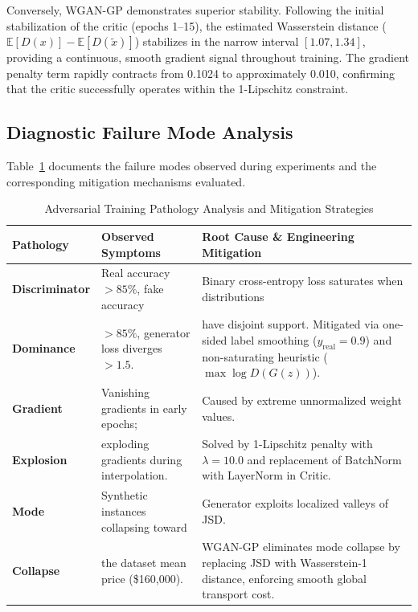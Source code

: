 \documentclass[11pt,letterpaper]{article}
\begin{document}
Conversely, WGAN-GP demonstrates superior stability. Following the initial stabilization of the critic (epochs 1--15), the estimated Wasserstein distance ($\mathbb{E}[D(x)] - \mathbb{E}[D(\tilde{x})]$) stabilizes in the narrow interval $[1.07, 1.34]$, providing a continuous, smooth gradient signal throughout training. The gradient penalty term rapidly contracts from 0.1024 to approximately 0.010, confirming that the critic successfully operates within the 1-Lipschitz constraint.

\subsection{Diagnostic Failure Mode Analysis}
Table~\ref{tab:failure_modes} documents the failure modes observed during experiments and the corresponding mitigation mechanisms evaluated.

\begin{table}[H]
\centering
\small
\caption{Adversarial Training Pathology Analysis and Mitigation Strategies}
\label{tab:failure_modes}
\begin{tabular}{lp{5.5cm}p{6.8cm}}
\toprule
\textbf{Pathology} & \textbf{Observed Symptoms} & \textbf{Root Cause \& Engineering Mitigation} \\
\midrule
\textbf{Discriminator} & Real accuracy $>85\%$, fake accuracy & Binary cross-entropy loss saturates when distributions \\
\textbf{Dominance}     & $>85\%$, generator loss diverges $>1.5$. & have disjoint support. Mitigated via one-sided label smoothing ($y_{\text{real}} = 0.9$) and non-saturating heuristic ($\max \log D(G(z))$). \\
\midrule
\textbf{Gradient}      & Vanishing gradients in early epochs; & Caused by extreme unnormalized weight values. \\
\textbf{Explosion}     & exploding gradients during interpolation. & Solved by 1-Lipschitz penalty with $\lambda = 10.0$ and replacement of BatchNorm with LayerNorm in Critic. \\
\midrule
\textbf{Mode}          & Synthetic instances collapsing toward & Generator exploits localized valleys of JSD. \\
\textbf{Collapse}      & the dataset mean price (\$160,000). & WGAN-GP eliminates mode collapse by replacing JSD with Wasserstein-1 distance, enforcing smooth global transport cost. \\
\bottomrule
\end{tabular}
\end{table}
\end{document}
